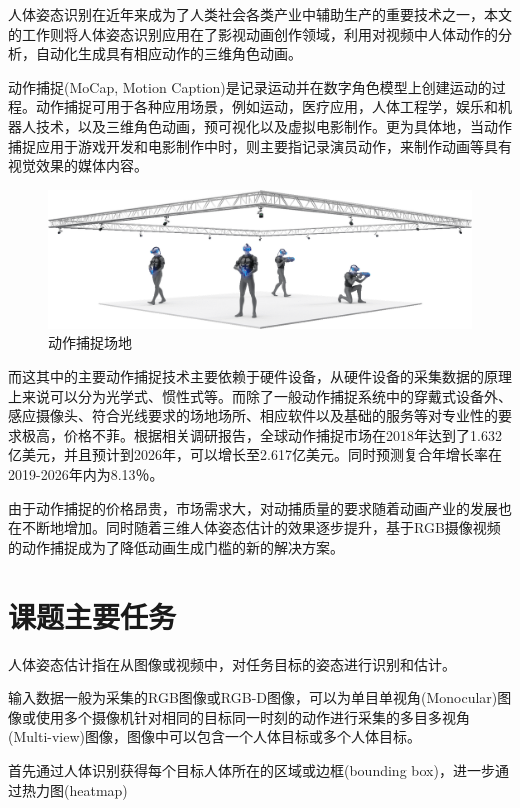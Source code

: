 人体姿态识别在近年来成为了人类社会各类产业中辅助生产的重要技术之一，本文的工作则将人体姿态识别应用在了影视动画创作领域，利用对视频中人体动作的分析，自动化生成具有相应动作的三维角色动画。

动作捕捉(MoCap, Motion Caption)是记录运动并在数字角色模型上创建运动的过程。动作捕捉可用于各种应用场景，例如运动，医疗应用，人体工程学，娱乐和机器人技术，以及三维角色动画，预可视化以及虚拟电影制作。更为具体地，当动作捕捉应用于游戏开发和电影制作中时，则主要指记录演员动作，来制作动画等具有视觉效果的媒体内容。

\begin{figure}[h]
	\centering
	\includegraphics[scale=0.4]{figures/3.png}
	\caption{动作捕捉场地}
	\label{fig:f3}
\end{figure}

而这其中的主要动作捕捉技术主要依赖于硬件设备，从硬件设备的采集数据的原理上来说可以分为光学式、惯性式等。而除了一般动作捕捉系统中的穿戴式设备外、感应摄像头、符合光线要求的场地场所、相应软件以及基础的服务等对专业性的要求极高，价格不菲。根据相关调研报告，全球动作捕捉市场在2018年达到了1.632亿美元，并且预计到2026年，可以增长至2.617亿美元。同时预测复合年增长率在2019-2026年内为8.13％。

由于动作捕捉的价格昂贵，市场需求大，对动捕质量的要求随着动画产业的发展也在不断地增加。同时随着三维人体姿态估计的效果逐步提升，基于RGB摄像视频的动作捕捉成为了降低动画生成门槛的新的解决方案。



\section{课题主要任务}{}

人体姿态估计指在从图像或视频中，对任务目标的姿态进行识别和估计。

输入数据一般为采集的RGB图像或RGB-D图像，可以为单目单视角(Monocular)图像或使用多个摄像机针对相同的目标同一时刻的动作进行采集的多目多视角(Multi-view)图像，图像中可以包含一个人体目标或多个人体目标。

首先通过人体识别获得每个目标人体所在的区域或边框(bounding box)，进一步通过热力图(heatmap)

